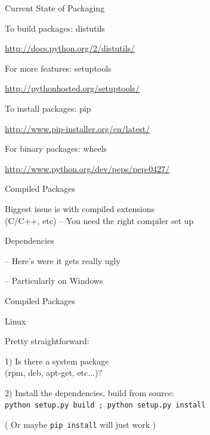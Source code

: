 \documentclass{beamer}
\begin{document}
\begin{frame}[fragile]{Current State of Packaging}

\vfill
{\Large To build packages: distutils}

\url{http://docs.python.org/2/distutils/}

\vfill
{\Large For more features: setuptools}

\url{http://pythonhosted.org/setuptools/}

\vfill
{\Large To install packages: pip}

\url{http://www.pip-installer.org/en/latest/}

\vfill
{\Large For binary packages: wheels}

\url{http://www.python.org/dev/peps/pep-0427/}


\end{frame} 

\begin{frame}[fragile]{Compiled Packages}

{\LARGE Biggest issue is with compiled extensions\\[0.1in]
\hfill(C/C++, etc)\hfill
}
\vfill
{\Large -- You need the right compiler set up}

\vfill
{\LARGE Dependencies}

\vfill
{\Large -- Here's were it gets really ugly}

\vfill
{\Large -- Particularly on Windows}

\end{frame} 

\begin{frame}[fragile]{Compiled Packages}

{\LARGE Linux}

\vfill
{\Large Pretty straightforward:}

\vfill
{\Large 1) Is there a system package \\[0.1in] (rpm, deb, apt-get, etc...)?
}

\vfill
{\Large 2) Install the dependencies, build from source:\\[0.1in]
\verb`python setup.py build ; python setup.py install` 

\vfill
( Or maybe \verb`pip install` will just work )
}

\end{frame} 
\end{document}

